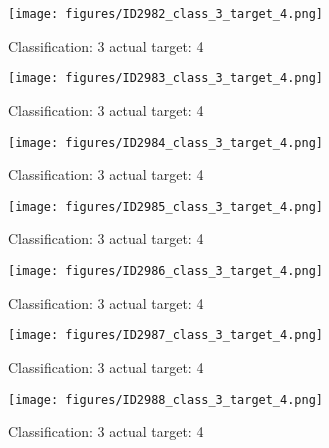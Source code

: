\begin{figure}[h!]
\begin{center}
\texttt{[image: figures/ID2982\_class\_3\_target\_4.png]}
\end{center}
\caption{ Classification: 3 actual target: 4}
\label{fig:ID2982_class_3_target_4}
\end{figure}
\begin{figure}[h!]
\begin{center}
\texttt{[image: figures/ID2983\_class\_3\_target\_4.png]}
\end{center}
\caption{ Classification: 3 actual target: 4}
\label{fig:ID2983_class_3_target_4}
\end{figure}
\begin{figure}[h!]
\begin{center}
\texttt{[image: figures/ID2984\_class\_3\_target\_4.png]}
\end{center}
\caption{ Classification: 3 actual target: 4}
\label{fig:ID2984_class_3_target_4}
\end{figure}
\begin{figure}[h!]
\begin{center}
\texttt{[image: figures/ID2985\_class\_3\_target\_4.png]}
\end{center}
\caption{ Classification: 3 actual target: 4}
\label{fig:ID2985_class_3_target_4}
\end{figure}
\begin{figure}[h!]
\begin{center}
\texttt{[image: figures/ID2986\_class\_3\_target\_4.png]}
\end{center}
\caption{ Classification: 3 actual target: 4}
\label{fig:ID2986_class_3_target_4}
\end{figure}
\begin{figure}[h!]
\begin{center}
\texttt{[image: figures/ID2987\_class\_3\_target\_4.png]}
\end{center}
\caption{ Classification: 3 actual target: 4}
\label{fig:ID2987_class_3_target_4}
\end{figure}
\begin{figure}[h!]
\begin{center}
\texttt{[image: figures/ID2988\_class\_3\_target\_4.png]}
\end{center}
\caption{ Classification: 3 actual target: 4}
\label{fig:ID2988_class_3_target_4}
\end{figure}
